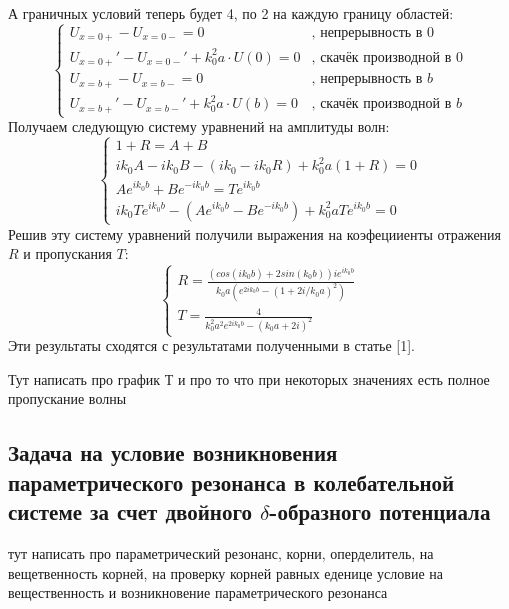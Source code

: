 \documentclass[11pt]{article}    %
\begin{document}
А граничных условий теперь будет 4, по 2 на каждую границу областей:
\begin{equation}
    \begin{cases}
        U_{x=0+} - U_{x=0-} = 0 & \text{, непрерывность в $0$}
        \\
        U_{x=0+}' - U_{x=0-}' + k_0^2 a \cdot U(0) = 0 & \text{, скачёк производной в $0$}
        \\
        U_{x=b+} - U_{x=b-} = 0 & \text{, непрерывность в $b$}
        \\
        U_{x=b+}' - U_{x=b-}' + k_0^2 a \cdot U(b) = 0 & \text{, скачёк производной в $b$}
    \end{cases}
\end{equation}
Получаем следующую систему уравнений на амплитуды волн:
\begin{equation}
    \begin{cases}
        1 + R = A + B %
        \\
        ik_{0}A - ik_{0}B - (ik_0 - ik_0R) + k_0^2 a (1 + R) = 0 %
        \\
        Ae^{ik_{0}b} + Be^{-ik_{0}b} = Te^{ik_{0}b} %
        \\
        ik_{0}Te^{ik_{0}b} - (Ae^{ik_{0}b} - Be^{-ik_{0}b}) + k_0^2 a Te^{ik_{0}b} = 0 %
    \end{cases}
\end{equation}
Решив эту систему уравнений получили выражения на коэфецииенты отражения $R$ и пропускания $T$:
\begin{equation}
    \begin{cases}
        R = \frac{(cos(ik_{0}b) + 2sin(k_0b))ie^{ik_{0}b}}{k_0a(e^{2ik_{0}b}-(1 + 2i/k_0a)^2)}
        \\
        T = \frac{4}{k_0^2a^2e^{2ik_{0}b}-(k_0a + 2i)^2}
    \end{cases}
\end{equation}
Эти результаты сходятся с результатами полученными в статье [1].
\par {\color{red} Тут написать про график Т и про то что при некоторых значениях есть полное пропускание волны}
\subsection{Задача на условие возникновения параметрического резонанса в колебательной системе за счет двойного $\delta$-образного потенциала}
\par {\color{red} тут написать про параметрический резонанс, корни, оперделитель, на вещетвенность корней, на проверку корней равных еденице условие на вещественность и возникновение параметрического резонанса}
\end{document}
